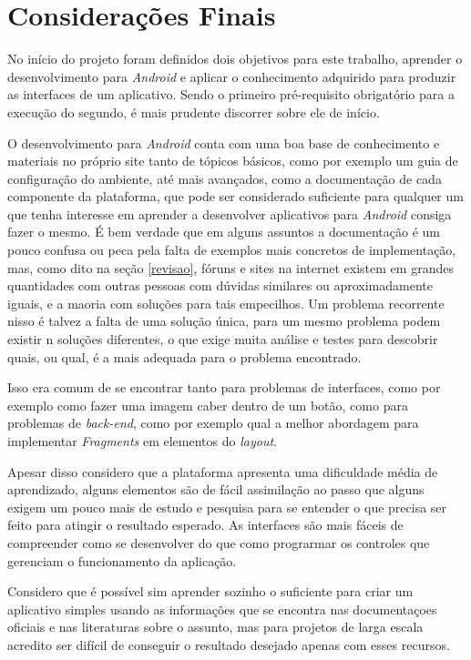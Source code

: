 \documentclass[hidelinks,12pt]{article}
\begin{document}
\section{Considera\c{c}\~oes Finais}
No in\'icio do projeto foram definidos dois objetivos para este trabalho, aprender o desenvolvimento para \textit{Android} e aplicar o conhecimento adquirido para produzir as interfaces de um aplicativo. Sendo o primeiro pr\'e-requisito obrigat\'orio para a execu\c{c}\~ao do segundo, \'e mais prudente discorrer sobre ele de in\'icio.

O desenvolvimento para \textit{Android} conta com uma boa base de conhecimento e materiais no pr\'oprio site tanto de t\'opicos b\'asicos, como por exemplo um guia de configura\c{c}\~ao do ambiente, at\'e mais avan\c{c}ados, como a documenta\c{c}\~ao de cada componente da plataforma, que pode ser considerado suficiente para qualquer um que tenha interesse em aprender a desenvolver aplicativos para \textit{Android} consiga fazer o mesmo. É bem verdade que em alguns assuntos a documenta\c{c}\~ao \'e um pouco confusa ou peca pela falta de exemplos mais concretos de implementa\c{c}\~ao, mas, como dito na se\c{c}\~ao \ref{revisao}, f\'oruns e sites na internet existem em grandes quantidades com outras pessoas com dúvidas similares ou aproximadamente iguais, e a maoria com solu\c{c}\~oes para tais empecilhos. Um problema recorrente nisso \'e talvez a falta de uma solu\c{c}\~ao única, para um mesmo problema podem existir n solu\c{c}\~oes diferentes, o que exige muita an\'alise e testes para descobrir quais, ou qual, \'e a mais adequada para o problema encontrado.

Isso era comum de se encontrar tanto para problemas de interfaces, como por exemplo como fazer uma imagem caber dentro de um bot\~ao, como para problemas de \textit{back-end}, como por exemplo qual a melhor abordagem para implementar \textit{Fragments} em elementos do \textit{layout}.

Apesar disso considero que a plataforma apresenta uma dificuldade m\'edia de aprendizado, alguns elementos s\~ao de f\'acil assimila\c{c}\~ao ao passo que alguns exigem um pouco mais de estudo e pesquisa para se entender o que precisa ser feito para atingir o resultado esperado. As interfaces s\~ao mais f\'aceis de compreender como se desenvolver do que como prograrmar os controles que gerenciam o funcionamento da aplica\c{c}\~ao.

Considero que \'e poss\'ivel sim aprender sozinho o suficiente para criar um aplicativo simples usando as informa\c{c}\~oes que se encontra nas documenta\c{c}oes oficiais e nas literaturas sobre o assunto, mas para projetos de larga escala acredito ser dif\'icil de conseguir o resultado desejado apenas com esses recursos.
\end{document}
